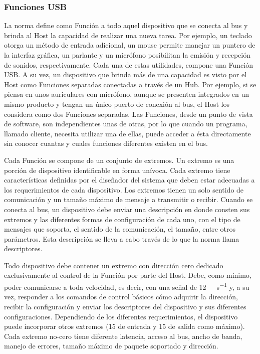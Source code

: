 \subsubsection{Funciones USB}
	La norma define como Función a todo aquel dispositivo que se conecta al bus y brinda al Host la capacidad de realizar una nueva tarea. Por ejemplo, un teclado otorga un método de entrada adicional, un mouse permite manejar un puntero de la interfaz gráfica, un parlante y un micrófono posibilitan la emisión y recepción de sonidos, respectivamente. Cada una de estas utilidades, compone una Función USB. A su vez, un dispositivo que brinda más de una capacidad es visto por el Host como Funciones separadas conectadas a través de un Hub. Por ejemplo, si se piensa en unos auriculares con micrófono, aunque se presenten integrados en un mismo producto y tengan un único puerto de conexión al bus, el Host los considera como dos Funciones separadas. Las Funciones, desde un punto de vista de software, son independientes unas de otras, por lo que cuando un programa, llamado cliente, necesita utilizar una de ellas, puede acceder a ésta directamente sin conocer cuantas y cuales funciones diferentes existen en el bus.%
	
	Cada Función se compone de un conjunto de extremos. Un extremo es una porción de dispositivo identificable en forma unívoca\cite{USBspec}. Cada extremo tiene características definidas por el diseñador del sistema que deben estar adecuadas a los requerimientos de cada dispositivo. Los extremos tienen un solo sentido de comunicación y un tamaño máximo de mensaje a transmitir o recibir. Cuando se conecta al bus, un dispositivo debe enviar una descripción en donde consten sus extremos y las diferentes formas de configuración de cada uno, con el tipo de mensajes que soporta, el sentido de la comunicación, el tamaño, entre otros parámetros. Esta descripción se lleva a cabo través de lo que la norma llama descriptores.%
	
	Todo dispositivo debe contener un extremo con dirección cero dedicado exclusivamente al control de la Función por parte del Host. Debe, como mínimo, poder comunicarse a toda velocidad, es decir, con una señal de \SI{12}{\mega\bit\per\second} y, a su vez, responder a los comandos de control básicos cómo adquirir la dirección, recibir la configuración y enviar los descriptores del dispositivo y sus diferentes configuraciones. Dependiendo de los diferentes requerimientos, el dispositivo puede incorporar otros extremos (15 de entrada y 15 de salida como máximo). Cada extremo no-cero tiene diferente latencia, acceso al bus, ancho de banda, manejo de errores, tamaño máximo de paquete soportado y dirección.
	
